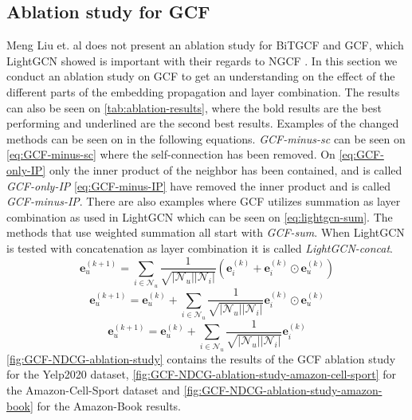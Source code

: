 \subsection{Ablation study for GCF}\label{subsec:gcf-ablation-study}
Meng Liu et. al does not present an ablation study for BiTGCF and GCF, which LightGCN showed is important with their regards to NGCF \cite{lightgcn,BiTGCF}.
In this section we conduct an ablation study on GCF to get an understanding on the effect of the different parts of the embedding propagation and layer combination.
The results can also be seen on \autoref{tab:ablation-results}, where the bold results are the best performing and underlined are the second best results.
Examples of the changed methods can be seen on in the following equations.
\textit{GCF-minus-sc} can be seen on \autoref{eq:GCF-minus-sc} where the self-connection has been removed.
On \autoref{eq:GCF-only-IP} only the inner product of the neighbor has been contained, and is called \textit{GCF-only-IP}
\autoref{eq:GCF-minus-IP} have removed the inner product and is called \textit{GCF-minus-IP}.
There are also examples where GCF utilizes summation as layer combination as used in LightGCN which can be seen on \autoref{eq:lightgcn-sum}.
The methods that use weighted summation all start with \textit{GCF-sum}.
When LightGCN is tested with concatenation as layer combination it is called \textit{LightGCN-concat}.
\begin{equation}
    \mathbf{e}_{u}^{(k+1)} = \sum^{}_{i \in \mathcal{N}_u}  \frac{1}{\sqrt{|\mathcal{N}_u||\mathcal{N}_i|}}\left( \mathbf{e}_i^{(k)} + \mathbf{e}_i^{(k)} \odot \mathbf{e}_u^{(k)} \right)
    \label{eq:GCF-minus-sc}
\end{equation}
\begin{equation}
    \mathbf{e}_{u}^{(k+1)} = \mathbf{e}_{u}^{(k)} + \sum^{}_{i \in \mathcal{N}_u}  \frac{1}{\sqrt{|\mathcal{N}_u||\mathcal{N}_i|}} \mathbf{e}_i^{(k)} \odot \mathbf{e}_u^{(k)}
    \label{eq:GCF-only-IP}
\end{equation}
\begin{equation}
    \mathbf{e}_{u}^{(k+1)} = \mathbf{e}_{u}^{(k)} + \sum^{}_{i \in \mathcal{N}_u}  \frac{1}{\sqrt{|\mathcal{N}_u||\mathcal{N}_i|}} \mathbf{e}_i^{(k)}
    \label{eq:GCF-minus-IP}
\end{equation}
\autoref{fig:GCF-NDCG-ablation-study} contains the results of the GCF ablation study for the Yelp2020 dataset, \autoref{fig:GCF-NDCG-ablation-study-amazon-cell-sport} for the Amazon-Cell-Sport dataset and \autoref{fig:GCF-NDCG-ablation-study-amazon-book} for the Amazon-Book results.
